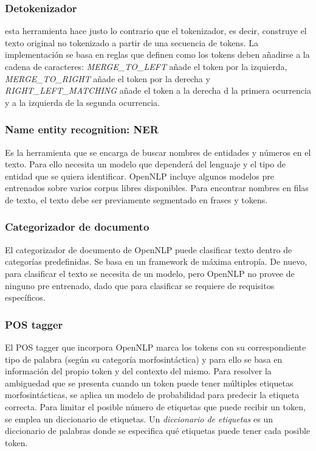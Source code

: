 \subsubsection{Detokenizador}
esta herramienta hace justo lo contrario que el tokenizador, es decir, construye el texto original no tokenizado a partir de una secuencia de tokens. La implementación se basa en reglas que definen como los tokens deben añadirse a la cadena de caracteres:  \textsl{MERGE\_TO\_LEFT} añade el token por la izquierda, \textsl{MERGE\_TO\_RIGHT} añade el token por la derecha y \textsl{RIGHT\_LEFT\_MATCHING} añade el token a la derecha d la primera ocurrencia y a la izquierda de la segunda ocurrencia.
\subsubsection{Name entity recognition: NER}
Es la herramienta que se encarga de buscar nombres de entidades y números en el texto. Para ello necesita un modelo que dependerá del lenguaje y el tipo de entidad que se quiera identificar. OpenNLP incluye algunos modelos pre entrenados sobre varios corpus libres disponibles. Para encontrar nombres en filas de texto, el texto debe ser previamente segmentado en frases y tokens.  
\subsubsection{Categorizador de documento}
El categorizador de documento de OpenNLP puede clasificar texto dentro de categorías predefinidas. Se basa en un framework de máxima entropía. De nuevo, para clasificar el texto se necesita de un modelo, pero OpenNLP no provee de ninguno pre entrenado, dado que para clasificar se requiere de requisitos específicos. 
\subsubsection{POS tagger}
El POS tagger que incorpora OpenNLP marca los tokens con su correspondiente tipo de palabra (según su categoría morfosintáctica) y para ello se basa en información del propio token y del contexto del mismo. Para resolver la ambiguedad que se presenta cuando un token puede tener múltiples etiquetas morfosintácticas, se aplica un modelo de probabilidad para predecir la etiqueta correcta. Para limitar el posible número de etiquetas que puede recibir un token, se emplea un diccionario de etiquetas. \newline
Un \textsl{diccionario de etiquetas} es un diccionario de palabras donde se especifica qué etiquetas puede tener cada posible token.
